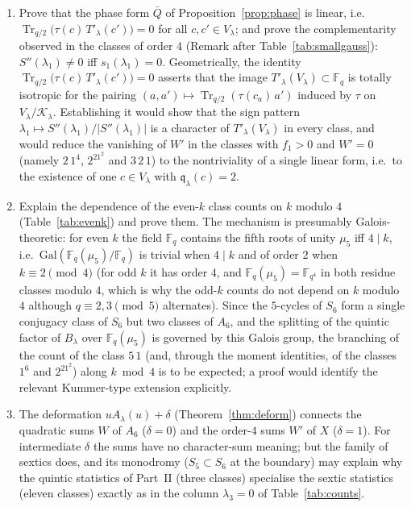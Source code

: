 \documentclass[12pt,a4paper]{amsart}
\theoremstyle{definition}
\newcommand{\F}{\mathbb{F}}
\newcommand{\Tr}{\operatorname{Tr}}
\newcommand{\Kk}{\mathcal{K}}
\newcommand{\qq}{\mathfrak{q}}
\newcommand{\Spp}{S''}
\begin{document}
\begin{enumerate}[label=\textbf{Open Problem \arabic*.},ref=\arabic*,wide,labelindent=0pt,itemsep=0.8ex]
\item Prove that the phase form $\bar Q$ of Proposition~\ref{prop:phase} is linear, i.e.\ $\Tr_{q/2}\bigl(\tau(c)\,T'_\lambda(c')\bigr)=0$ for all $c,c'\in V_\lambda$; and prove the complementarity observed in the classes of order $4$ (Remark after Table~\ref{tab:smallgauss}): $\Spp(\lambda_1)\ne0$ iff $s_1(\lambda_1)=0$. Geometrically, the identity $\Tr_{q/2}\bigl(\tau(c)\,T'_\lambda(c')\bigr)=0$ asserts that the image $T'_\lambda(V_\lambda)\subset\F_q$ is totally isotropic for the pairing $(a,a')\mapsto\Tr_{q/2}(\tau(c_a)\,a')$ induced by $\tau$ on $V_\lambda/\Kk_\lambda$. Establishing it would show that the sign pattern $\lambda_1\mapsto\Spp(\lambda_1)/|\Spp(\lambda_1)|$ is a character of $T'_\lambda(V_\lambda)$ in every class, and would reduce the vanishing of $W'$ in the classes with $f_1>0$ and $W'=0$ (namely $2\,1^4$, $2^21^2$ and $3\,2\,1$) to the nontriviality of a single linear form, i.e.\ to the existence of one $c\in V_\lambda$ with $\qq_\lambda(c)=2$.
\item Explain the dependence of the even-$k$ class counts on $k$ modulo $4$ (Table~\ref{tab:evenk}) and prove them. The mechanism is presumably Galois-theoretic: for even $k$ the field $\F_q$ contains the fifth roots of unity $\mu_5$ iff $4\mid k$, i.e.\ $\mathrm{Gal}(\F_q(\mu_5)/\F_q)$ is trivial when $4\mid k$ and of order $2$ when $k\equiv2\pmod4$ (for odd $k$ it has order $4$, and $\F_q(\mu_5)=\F_{q^4}$ in both residue classes modulo $4$, which is why the odd-$k$ counts do not depend on $k$ modulo $4$ although $q\equiv2,3\pmod5$ alternates). Since the $5$-cycles of $S_6$ form a single conjugacy class of $S_6$ but two classes of $A_6$, and the splitting of the quintic factor of $B_\lambda$ over $\F_q(\mu_5)$ is governed by this Galois group, the branching of the count of the class $5\,1$ (and, through the moment identities, of the classes $1^6$ and $2^21^2$) along $k\bmod4$ is to be expected; a proof would identify the relevant Kummer-type extension explicitly.
\item The deformation $uA_\lambda(u)+\delta$ (Theorem~\ref{thm:deform}) connects the quadratic sums $W$ of $A_6$ ($\delta=0$) and the order-$4$ sums $W'$ of $X$ ($\delta=1$). For intermediate $\delta$ the sums have no character-sum meaning; but the family of sextics does, and its monodromy ($S_5\subset S_6$ at the boundary) may explain why the quintic statistics of Part~II (three classes) specialise the sextic statistics (eleven classes) exactly as in the column $\lambda_3=0$ of Table~\ref{tab:counts}.
\end{enumerate}
\end{document}
